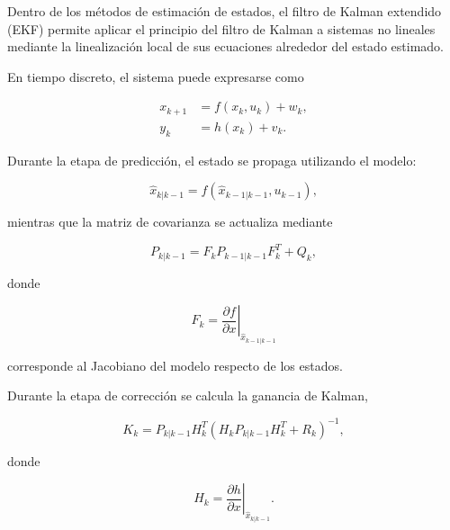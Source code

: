 %
%

Dentro de los métodos de estimación de estados, el filtro de Kalman extendido 
(EKF) permite aplicar el principio del filtro de Kalman a sistemas no lineales 
mediante la linealización local de sus ecuaciones alrededor del estado 
estimado.

En tiempo discreto, el sistema puede expresarse como

\begin{equation}
\begin{aligned}
x_{k+1} &= f(x_k,u_k)+w_k,\\
y_k &= h(x_k)+v_k.
\end{aligned}
\end{equation}

Durante la etapa de predicción, el estado se propaga utilizando el modelo:

\begin{equation}
\hat{x}_{k|k-1}
=
f(\hat{x}_{k-1|k-1},u_{k-1}),
\end{equation}

mientras que la matriz de covarianza se actualiza mediante

\begin{equation}
P_{k|k-1}
=
F_kP_{k-1|k-1}F_k^{T}
+
Q_k,
\end{equation}

donde

\begin{equation}
F_k
=
\left.
\frac{\partial f}{\partial x}
\right|_{\hat{x}_{k-1|k-1}}
\end{equation}

corresponde al Jacobiano del modelo respecto de los estados.

Durante la etapa de corrección se calcula la ganancia de Kalman,

\begin{equation}
K_k
=
P_{k|k-1}H_k^T
\left(
H_kP_{k|k-1}H_k^T+R_k
\right)^{-1},
\end{equation}

donde

\begin{equation}
H_k
=
\left.
\frac{\partial h}{\partial x}
\right|_{\hat{x}_{k|k-1}}.
\end{equation}


